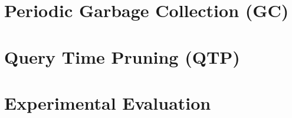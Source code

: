 \documentclass[abstracton,12pt]{scrartcl}
\theoremstyle{definition}
\begin{document}
\section{Periodic Garbage Collection (GC)}

\section{Query Time Pruning (QTP)}

\section{Experimental Evaluation}






\newpage



\end{document}
